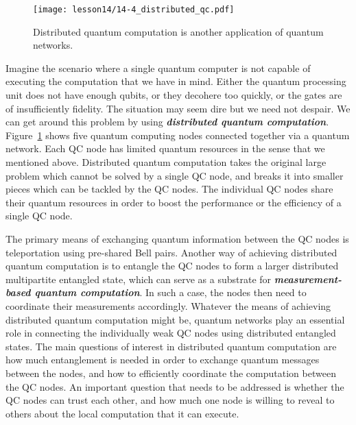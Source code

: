\begin{figure}[t]
    \centering
    \texttt{[image: lesson14/14-4\_distributed\_qc.pdf]}
    \caption[Distributed quantum computation.]{Distributed quantum computation is another application of quantum networks.}
    \label{fig:14-4_distributed_qc}
\end{figure}

Imagine the scenario where a single quantum computer is not capable of executing the computation that we have in mind.
Either the quantum processing unit does not have enough qubits, or they decohere too quickly, or the gates are of insufficiently fidelity.
The situation may seem dire but we need not despair.
We can get around this problem by using \textbf{\emph{distributed quantum computation}}.
Figure~\ref{fig:14-4_distributed_qc} shows five quantum computing nodes connected together via a quantum network.
Each QC node has limited quantum resources in the sense that we mentioned above.
Distributed quantum computation takes the original large problem which cannot be solved by a single QC node, and breaks it into smaller pieces which can be tackled by the QC nodes.
The individual QC nodes share their quantum resources in order to boost the performance or the efficiency of a single QC node.

The primary means of exchanging quantum information between the QC nodes is teleportation using pre-shared Bell pairs.
Another way of achieving distributed quantum computation is to entangle the QC nodes to form a larger distributed multipartite entangled state, which can serve as a substrate for \textbf{\emph{measurement-based quantum computation}}.
In such a case, the nodes then need to coordinate their measurements accordingly.
Whatever the means of achieving distributed quantum computation might be, quantum networks play an essential role in connecting the individually weak QC nodes using distributed entangled states.
The main questions of interest in distributed quantum computation are how much entanglement is needed in order to exchange quantum messages between the nodes, and how to efficiently coordinate the computation between the QC nodes.
An important question that needs to be addressed is whether the QC nodes can trust each other, and how much one node is willing to reveal to others about the local computation that it can execute.

